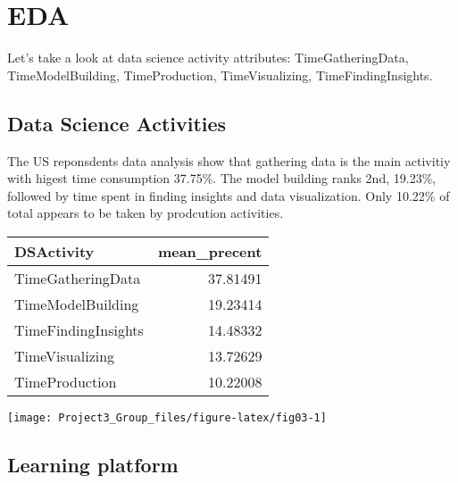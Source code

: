 \documentclass[]{article}
\begin{document}
\hypertarget{eda}{%
\section{EDA}\label{eda}}

Let's take a look at data science activity attributes:
TimeGatheringData, TimeModelBuilding, TimeProduction, TimeVisualizing,
TimeFindingInsights.

\hypertarget{data-science-activities}{%
\subsection{Data Science Activities}\label{data-science-activities}}

The US reponsdents data analysis show that gathering data is the main
activitiy with higest time consumption 37.75\%. The model building ranks
2nd, 19.23\%, followed by time spent in finding insights and data
visualization. Only 10.22\% of total appears to be taken by prodcution
activities.

\begin{tabular}{l|r}
\hline
DSActivity & mean\_precent\\
\hline
TimeGatheringData & 37.81491\\
\hline
TimeModelBuilding & 19.23414\\
\hline
TimeFindingInsights & 14.48332\\
\hline
TimeVisualizing & 13.72629\\
\hline
TimeProduction & 10.22008\\
\hline
\end{tabular}

\begin{center}\texttt{[image: Project3\_Group\_files/figure-latex/fig03-1]} \end{center}

\hypertarget{learning-platform}{%
\subsection{Learning platform}\label{learning-platform}}
\end{document}
